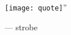
\pagebreak
\thispagestyle{empty}
\null\vfill

\begin{minipage}[b]{\linewidth}
    \centering
    \Huge{\raisebox{4.5cm}{``}
    \texttt{[image: quote]}''}

    \raggedleft\Large{--- strobe}\par%
\end{minipage}
\vfill\vfill
\clearpage
\pagebreak